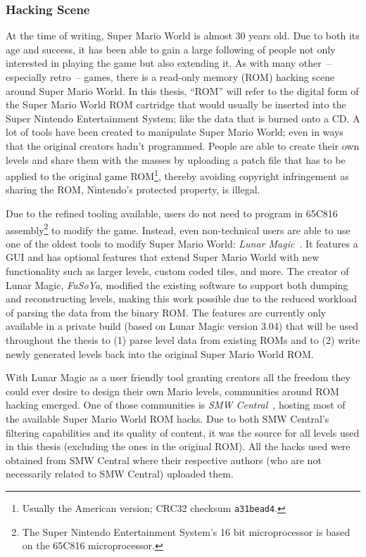 \subsubsection{Hacking Scene}
\label{sec:hacks}

At the time of writing, Super Mario World is almost 30 years old. Due
to both its age and success, it has been able to gain a large
following of people not only interested in playing the game but also
extending it. As with many other~-- especially retro~-- games, there
is a read-only memory (ROM) hacking scene around Super Mario World. In
this thesis, ``ROM'' will refer to the digital form of the Super Mario
World ROM cartridge that would usually be inserted into the Super
Nintendo Entertainment System; like the data that is burned onto a CD.
A lot of tools have been created to manipulate Super Mario World; even
in ways that the original creators hadn't programmed. People are able
to create their own levels and share them with the masses by uploading
a patch file that has to be applied to the original game ROM\footnote{Usually
the American version; CRC32 checksum \texttt{a31bead4}.}, thereby
avoiding copyright infringement as sharing the ROM, Nintendo's
protected property, is illegal.

Due to the refined tooling available, users do not need to program in
65C816 assembly\footnote{The Super Nintendo Entertainment System's 16
  bit microprocessor is based on the 65C816 microprocessor.} to modify
the game. Instead, even non-technical users are able to use one of the
oldest tools to modify Super Mario World: \emph{Lunar
  Magic}~\cite{FuSoYaNicheLunar}. It features a GUI and has optional
features that extend Super Mario World with new functionality such as
larger levels, custom coded tiles, and more. The creator of Lunar
Magic, \emph{FuSoYa}, modified the existing software to support both
dumping and reconstructing levels, making this work possible due to
the reduced workload of parsing the data from the binary ROM. The
features are currently only available in a private build (based on
Lunar Magic version 3.04) that will be used throughout the thesis to
(1) parse level data from existing ROMs and to (2) write newly
generated levels back into the original Super Mario World ROM.

With Lunar Magic as a user friendly tool granting creators all the
freedom they could ever desire to design their own Mario levels,
communities around ROM hacking emerged. One of those communities is
\emph{SMW Central}~\cite{SMWCentralYour}, hosting most of the
available Super Mario World ROM hacks. Due to both SMW Central's
filtering capabilities and its quality of content, it was the source
for all levels used in this thesis (excluding the ones in the original
ROM). All the hacks used were obtained from SMW Central where their
respective authors (who are not necessarily related to SMW Central)
uploaded them.

